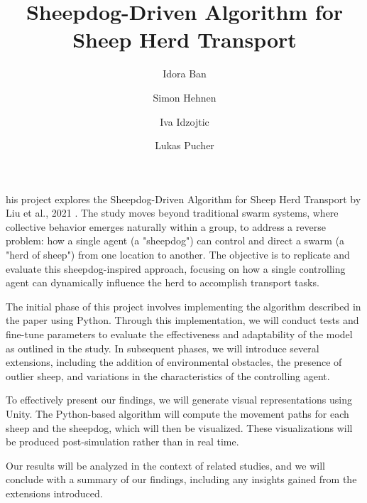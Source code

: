 \documentclass[9pt]{pnas-new}
\title{Sheepdog-Driven Algorithm for Sheep Herd Transport}
\author{Idora Ban}
\author{Simon Hehnen}
\author{Iva Idzojtic}
\author{Lukas Pucher}
\affil{Collective behaviour course research seminar report}
\begin{document}
\verticaladjustment{-2pt}

\maketitle
\thispagestyle{firststyle}


his project explores the Sheepdog-Driven Algorithm for Sheep Herd Transport by Liu et al., 2021 \cite{liu2021}. The study moves beyond traditional swarm systems, where collective behavior emerges naturally within a group, to address a reverse problem: how a single agent (a "sheepdog") can control and direct a swarm (a "herd of sheep") from one location to another. The objective is to replicate and evaluate this sheepdog-inspired approach, focusing on how a single controlling agent can dynamically influence the herd to accomplish transport tasks.

The initial phase of this project involves implementing the algorithm described in the paper using Python. Through this implementation, we will conduct tests and fine-tune parameters to evaluate the effectiveness and adaptability of the model as outlined in the study. In subsequent phases, we will introduce several extensions, including the addition of environmental obstacles, the presence of outlier sheep, and variations in the characteristics of the controlling agent.

To effectively present our findings, we will generate visual representations using Unity. The Python-based algorithm will compute the movement paths for each sheep and the sheepdog, which will then be visualized. These visualizations will be produced post-simulation rather than in real time.

Our results will be analyzed in the context of related studies, and we will conclude with a summary of our findings, including any insights gained from the extensions introduced.
\end{document}
